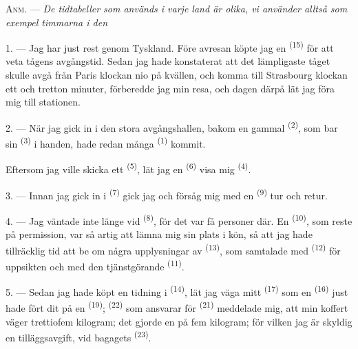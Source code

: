 
\VUsaut{4.0mm}
\VUsaut{2.4mm}
\VUsaut{3.4mm}
\textsc{Anm.} --- \textit{De tidtabeller som används i varje land är olika, vi använder alltså
som exempel timmarna i den} 

1. --- Jag har just rest genom Tyskland. Före avresan köpte jag en
 \textsuperscript{(15)} för att veta tågens avgångstid.
Sedan jag hade konstaterat att det lämpligaste tåget skulle avgå från Paris klockan nio på
kvällen, och komma till Strasbourg klockan ett och tretton minuter, förberedde jag min resa,
och dagen därpå lät jag föra mig till stationen.

2. --- När jag gick in i den stora avgångshallen, bakom en gammal
 \textsuperscript{(2)}, som bar sin 
\textsuperscript{(3)} i handen, hade redan många  \textsuperscript{(1)}
kommit.

Eftersom jag ville skicka ett  \textsuperscript{(5)}, lät jag en
 \textsuperscript{(6)} visa mig 
\textsuperscript{(4)}.

3. --- Innan jag gick in i  \textsuperscript{(7)} gick jag och försåg mig
med en  \textsuperscript{(9)} tur och retur.

4. --- Jag väntade inte länge vid  \textsuperscript{(8)}, för det var få
personer där. En  \textsuperscript{(10)}, som reste på permission, var så artig
att lämna mig sin plats i kön, så att jag hade tillräcklig tid att be om några upplysningar av
 \textsuperscript{(13)}, som samtalade med 
\textsuperscript{(12)} för uppsikten och med den tjänstgörande
 \textsuperscript{(11)}.

\VUsaut{3.0mm}

5. --- Sedan jag hade köpt en tidning i  \textsuperscript{(14)}, lät jag
väga mitt  \textsuperscript{(17)} som en  \textsuperscript{(16)}
just hade fört dit på en
 \textsuperscript{(19)}; 
\textsuperscript{(22)} som ansvarar för  \textsuperscript{(21)} meddelade mig,
att min koffert väger trettiofem kilogram; det gjorde en
 på fem kilogram; för vilken jag är skyldig en tilläggsavgift,
vid bagagets  \textsuperscript{(23)}.


